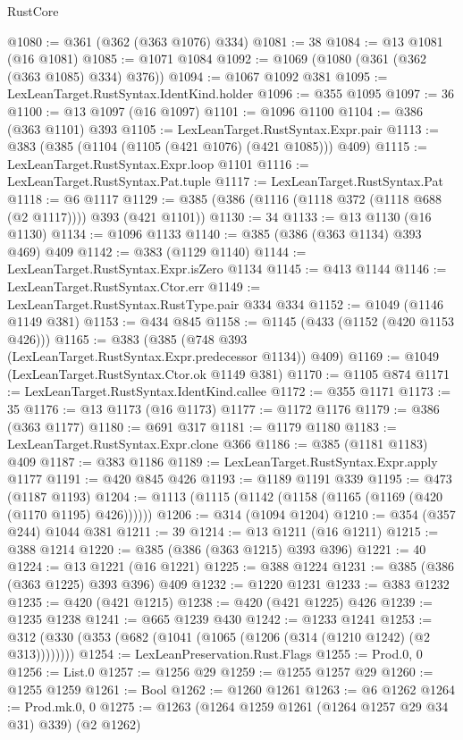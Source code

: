 \begin{lexlean}{RustCore}
\begin{coremodule}
@1080 := @361 (@362 (@363 @1076) @334)
@1081 := 38
@1084 := @13 @1081 (@16 @1081)
@1085 := @1071 @1084
@1092 := @1069 (@1080 (@361 (@362 (@363 @1085) @334) @376))
@1094 := @1067 @1092 @381
@1095 := LexLeanTarget.RustSyntax.IdentKind.holder
@1096 := @355 @1095
@1097 := 36
@1100 := @13 @1097 (@16 @1097)
@1101 := @1096 @1100
@1104 := @386 (@363 @1101) @393
@1105 := LexLeanTarget.RustSyntax.Expr.pair
@1113 := @383 (@385 (@1104 (@1105 (@421 @1076) (@421 @1085))) @409)
@1115 := LexLeanTarget.RustSyntax.Expr.loop @1101
@1116 := LexLeanTarget.RustSyntax.Pat.tuple
@1117 := LexLeanTarget.RustSyntax.Pat
@1118 := @6 @1117
@1129 := @385 (@386 (@1116 (@1118 @372 (@1118 @688 (@2 @1117)))) @393 (@421 @1101))
@1130 := 34
@1133 := @13 @1130 (@16 @1130)
@1134 := @1096 @1133
@1140 := @385 (@386 (@363 @1134) @393 @469) @409
@1142 := @383 (@1129 @1140)
@1144 := LexLeanTarget.RustSyntax.Expr.isZero @1134
@1145 := @413 @1144
@1146 := LexLeanTarget.RustSyntax.Ctor.err
@1149 := LexLeanTarget.RustSyntax.RustType.pair @334 @334
@1152 := @1049 (@1146 @1149 @381)
@1153 := @434 @845
@1158 := @1145 (@433 (@1152 (@420 @1153 @426)))
@1165 := @383 (@385 (@748 @393 (LexLeanTarget.RustSyntax.Expr.predecessor @1134)) @409)
@1169 := @1049 (LexLeanTarget.RustSyntax.Ctor.ok @1149 @381)
@1170 := @1105 @874
@1171 := LexLeanTarget.RustSyntax.IdentKind.callee
@1172 := @355 @1171
@1173 := 35
@1176 := @13 @1173 (@16 @1173)
@1177 := @1172 @1176
@1179 := @386 (@363 @1177)
@1180 := @691 @317
@1181 := @1179 @1180
@1183 := LexLeanTarget.RustSyntax.Expr.clone @366
@1186 := @385 (@1181 @1183) @409
@1187 := @383 @1186
@1189 := LexLeanTarget.RustSyntax.Expr.apply @1177
@1191 := @420 @845 @426
@1193 := @1189 @1191 @339
@1195 := @473 (@1187 @1193)
@1204 := @1113 (@1115 (@1142 (@1158 (@1165 (@1169 (@420 (@1170 @1195) @426))))))
@1206 := @314 (@1094 @1204)
@1210 := @354 (@357 @244) @1044 @381
@1211 := 39
@1214 := @13 @1211 (@16 @1211)
@1215 := @388 @1214
@1220 := @385 (@386 (@363 @1215) @393 @396)
@1221 := 40
@1224 := @13 @1221 (@16 @1221)
@1225 := @388 @1224
@1231 := @385 (@386 (@363 @1225) @393 @396) @409
@1232 := @1220 @1231
@1233 := @383 @1232
@1235 := @420 (@421 @1215)
@1238 := @420 (@421 @1225) @426
@1239 := @1235 @1238
@1241 := @665 @1239 @430
@1242 := @1233 @1241
@1253 := @312 (@330 (@353 (@682 (@1041 (@1065 (@1206 (@314 (@1210 @1242) (@2 @313))))))))
@1254 := LexLeanPreservation.Rust.Flags
@1255 := Prod.{0, 0}
@1256 := List.{0}
@1257 := @1256 @29
@1259 := @1255 @1257 @29
@1260 := @1255 @1259
@1261 := Bool
@1262 := @1260 @1261
@1263 := @6 @1262
@1264 := Prod.mk.{0, 0}
@1275 := @1263 (@1264 @1259 @1261 (@1264 @1257 @29 @34 @31) @339) (@2 @1262)

\end{coremodule}
\end{lexlean}

